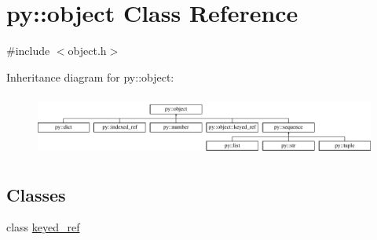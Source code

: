 \hypertarget{classpy_1_1object}{}\section{py\+:\+:object Class Reference}
\label{classpy_1_1object}


{\ttfamily \#include $<$object.\+h$>$}

Inheritance diagram for py\+:\+:object\+:\begin{figure}[H]
\begin{center}
\leavevmode
\includegraphics[height=2.043796cm]{classpy_1_1object}
\end{center}
\end{figure}
\subsection*{Classes}
\begin{DoxyCompactItemize}
\item 
class \hyperlink{classpy_1_1object_1_1keyed__ref}{keyed\+\_\+ref}
\end{DoxyCompactItemize}
